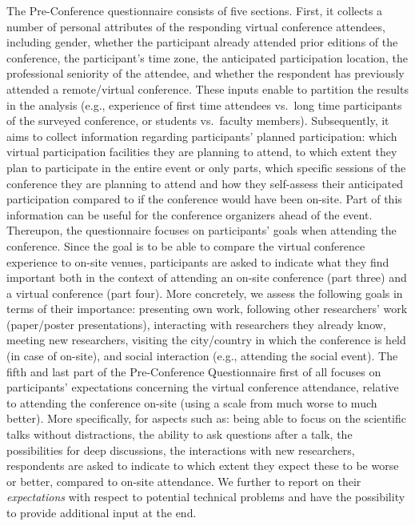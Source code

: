 \documentclass[sigconf]{acmart}
\begin{document}
The Pre-Conference questionnaire consists of five sections.
First, it collects a number of personal attributes of the responding virtual conference attendees, including gender, whether the participant already attended prior editions of the conference, the participant's time zone, the anticipated participation location, the professional seniority of the attendee, and whether the respondent has previously attended a remote/virtual conference.
These inputs enable to partition the results in the analysis (e.g., experience of first time attendees vs.\ long time participants of the surveyed conference, or students vs.\ faculty members).
Subsequently, it aims to collect information regarding participants' planned participation: which virtual participation facilities they are planning to attend, to which extent they plan to participate in the entire event or only parts, which specific sessions of the conference they are planning to attend and how they self-assess their anticipated participation compared to if the conference would have been on-site.
Part of this information can be useful for the conference organizers ahead of the event.
Thereupon, the questionnaire focuses on participants' goals when attending the conference.
Since the goal is to be able to compare the virtual conference experience to on-site venues, participants are asked to indicate what they find important both in the context of attending an on-site conference (part three) and a virtual conference (part four).
More concretely, we assess the following goals in terms of their importance: presenting own work, following other researchers' work (paper/poster presentations), interacting with researchers they already know, meeting new researchers, visiting the city/country in which the conference is held (in case of on-site), and social interaction (e.g., attending the social event).
The fifth and last part of the Pre-Conference Questionnaire first of all focuses on participants' expectations concerning the virtual conference attendance, relative to attending the conference on-site (using a scale from much worse to much better).
More specifically, for aspects such as: being able to focus on the scientific talks without distractions, the ability to ask questions after a talk, the possibilities for deep discussions, the interactions with new researchers, respondents are asked to indicate to which extent they expect these to be worse or better, compared to on-site attendance.
We further to report on their \emph{expectations} with respect to potential technical problems and have the possibility to provide additional input at the end.
\end{document}
